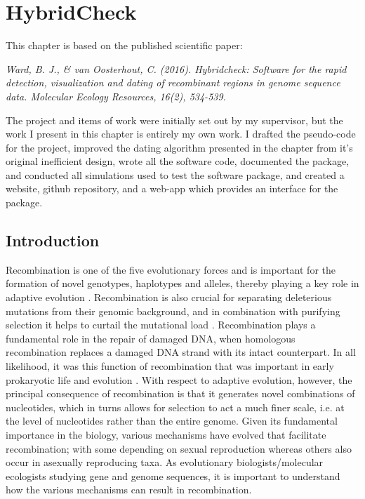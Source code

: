 \chapter{HybridCheck}
\label{chap:HC}

This chapter is based on the published scientific paper:

\vspace{5mm}

\textit{Ward, B. J., \& van Oosterhout, C. (2016). Hybridcheck: Software for the rapid detection, visualization and dating of recombinant regions in genome sequence data. Molecular Ecology Resources, 16(2), 534-539.}

\vspace{5mm}

The project and items of work were initially set out by my supervisor, but the work I present in this chapter is entirely my own work.
I drafted the pseudo-code for the project, improved the dating algorithm presented in the chapter from it's original inefficient design, wrote all the software code, documented the package, and conducted all simulations used to test the software package, and created a website, github repository, and a web-app which provides an interface for the package.


\newpage


\section{Introduction}

Recombination is one of the five evolutionary forces and is important for the formation of novel genotypes, haplotypes and alleles, thereby playing a key role in adaptive evolution \parencite{Grauer2000}. Recombination is also crucial for separating deleterious mutations from their genomic background, and in combination with purifying selection it helps to curtail the mutational load \parencite{Lynch1990a}. Recombination plays a fundamental role in the repair of damaged DNA, when homologous recombination replaces a damaged DNA strand with its intact counterpart. In all likelihood, it was this function of recombination that was important in early prokaryotic life and evolution \parencite{Cavalier-Smith2002}. With respect to adaptive evolution, however, the principal consequence of recombination is that it generates novel combinations of nucleotides, which in turns allows for selection to act a much finer scale, i.e. at the level of nucleotides rather than the entire genome. Given its fundamental importance in the biology, various mechanisms have evolved that facilitate recombination; with some depending on sexual reproduction whereas others also occur in asexually reproducing taxa. As evolutionary biologists/molecular ecologists studying gene and genome sequences, it is important to understand how the various mechanisms can result in recombination.

